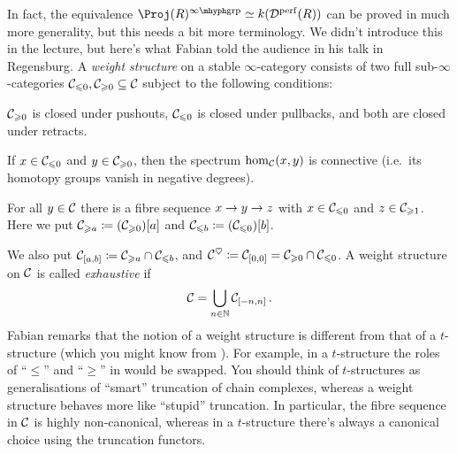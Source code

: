 \documentclass[a4paper, 10pt, oneside, DIV=9, chapterprefix=true, numbers=enddot,bibliography=totoc]{scrbook}
\begin{document}
In fact, the equivalence $\Proj(R)^\inftygrp\simeq k(\Dd^\perf(R))$ can be proved in much more generality, but this needs a bit more terminology.
\label{par:WeightStructure}
We didn't introduce this in the lecture, but here's what Fabian told the audience in his talk in Regensburg. A \emph{weight structure} on a stable $\infty$-category consists of two full sub-$\infty$-categories $\mathcal{C}_{\leqslant 0},\mathcal{C}_{\geqslant 0}\subseteq \mathcal{C}$ subject to the following conditions:
\begin{alphanumerate}
	\item $\mathcal{C}_{\geqslant 0}$ is closed under pushouts, $\mathcal{C}_{\leqslant 0}$ is closed under pullbacks, and both are closed under retracts.
	\item If $x\in \mathcal{C}_{\leqslant 0}$ and $y\in \mathcal{C}_{\geqslant 0}$, then the spectrum $\hom_{\mathcal{C}}(x,y)$ is connective (i.e.\ its homotopy groups vanish in negative degrees).
	\item For all $y\in \mathcal{C}$ there is a fibre sequence $x\morphism y\morphism z$ with $x\in \mathcal{C}_{\leqslant 0}$ and $z\in \mathcal{C}_{\geqslant 1}$. Here we put $\mathcal{C}_{\geqslant a}\coloneqq (\mathcal{C}_{\geqslant 0})[a]$ and $\mathcal{C}_{\leqslant b}\coloneqq (\mathcal{C}_{\leqslant 0})[b]$.
\end{alphanumerate}
We also put $\mathcal{C}_{[a,b]}\coloneqq \mathcal{C}_{\geqslant a}\cap \mathcal{C}_{\leqslant b}$, and $\mathcal{C}^\heartsuit\coloneqq \mathcal{C}_{[0,0]}=\mathcal{C}_{\geqslant 0}\cap \mathcal{C}_{\leqslant 0}$. A weight structure on $\mathcal{C}$ is called \emph{exhaustive} if
\begin{equation*}
	\mathcal{C}=\bigcup_{n\in\mathbb{N}}\mathcal{C}_{[-n,n]}\,.
\end{equation*}
Fabian remarks that the notion of a weight structure is different from that of a $t$-structure (which you might know from \cite[Definition~]{HA}). For example, in a $t$-structure the roles of \enquote{$\leq$} and \enquote{$\geq$} in  would be swapped. You should think of $t$-structures as generalisations of \enquote{smart} truncation of chain complexes, whereas a weight structure behaves more like \enquote{stupid} truncation. In particular, the fibre sequence in $\mathcal{C}$ is highly non-canonical, whereas in a $t$-structure there's always a canonical choice using the truncation functors.
\end{document}
